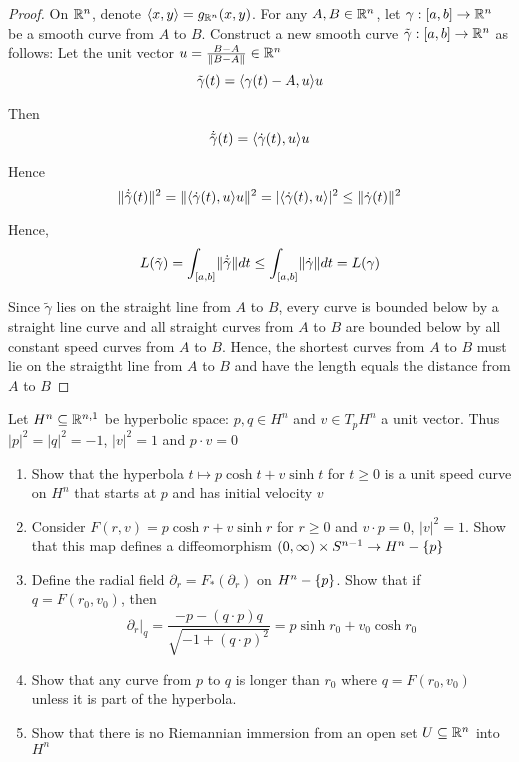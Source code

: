 \begin{proof}
	
	On $\mathbb{R}^n$, denote $\langle x, y\rangle = g_{\mathbb{R}^n}(x, y)$. For any $A, B \in \mathbb{R}^n$, let $\gamma: [a, b] \to \mathbb{R}^n$ be a smooth curve from $A$ to $B$. Construct a new smooth curve $\tilde{\gamma}: [a, b] \to \mathbb{R}^n$ as follows: Let the unit vector $u = \frac{B - A}{\lVert B - A\rVert} \in \mathbb{R}^n$
	$$
		\tilde{\gamma}(t) = \langle\gamma(t) - A, u\rangle u
	$$
	
	Then
	$$
		\dot{\tilde{\gamma}}(t) = \langle\dot{\gamma}(t), u\rangle u
	$$
	
	Hence
	$$
		\lVert\dot{\tilde{\gamma}}(t)\rVert^2 = \lVert\langle\dot{\gamma}(t), u\rangle u\rVert^2 = \lvert\langle\dot{\gamma}(t), u\rangle\rvert^2 \leq \lVert\dot{\gamma}(t)\rVert^2
	$$
	
	Hence, 
	$$
		L(\tilde{\gamma}) = \int_{[a, b]} \lVert\dot{\tilde{\gamma}}\rVert dt \leq \int_{[a, b]} \lVert\dot{\gamma}\rVert dt = L(\gamma)
	$$
	
	Since $\tilde{\gamma}$ lies on the straight line from $A$ to $B$, every curve is bounded below by a straight line curve and all straight curves from $A$ to $B$ are bounded below by all constant speed curves from $A$ to $B$. Hence, the shortest curves from $A$ to $B$ must lie on the straigtht line from $A$ to $B$ and have the length equals the distance from $A$ to $B$
\end{proof}

\begin{problem}
	Let $H^n \subseteq \mathbb{R}^{n, 1}$ be hyperbolic space: $p, q \in H^n$ and $v \in T_p H^n$ a unit vector. Thus $|p|^2 = |q|^2 = -1$, $|v|^2 = 1$ and $p \cdot v = 0$
	
	\begin{enumerate}
		\item Show that the hyperbola $t \mapsto p \cosh t + v \sinh t$ for $t \geq 0$ is a unit speed curve on $H^n$ that starts at $p$ and has initial velocity $v$
		
		\item Consider $F(r, v) = p \cosh r + v \sinh r$ for $r \geq 0$ and $v \cdot p = 0$, $|v|^2 = 1$. Show that this map defines a diffeomorphism $(0, \infty) \times S^{n-1} \to H^n - \{p\}$
		
		\item Define the radial field $\partial_r = F_*(\partial_r)$ on $H^n - \{p\}$. Show that if $q = F(r_0, v_0)$, then 
		$$
			\partial_r\vert_q = \frac{-p - (q \cdot p) q}{\sqrt{-1 + (q \cdot p)^2}} = p \sinh r_0 + v_0 \cosh r_0
		$$
		
		\item Show that any curve from $p$ to $q$ is longer than $r_0$ where $q = F(r_0, v_0)$ unless it is part of the hyperbola.
		
		\item Show that there is no Riemannian immersion from an open set $U \subseteq \mathbb{R}^n$ into $H^n$
	\end{enumerate}
\end{problem}

